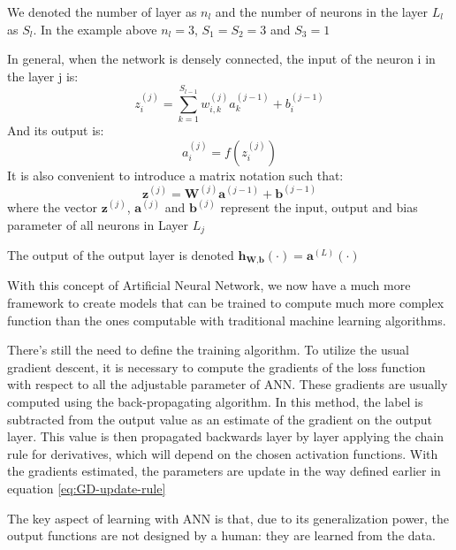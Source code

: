 \documentclass{article}
\begin{document}
We denoted the number of layer as $n_l$ and the number of neurons in the layer $L_l$ as $S_l$. In the example above $n_l=3$, $S_1 = S_2 = 3$ and $S_3 = 1$

In general, when the network is densely connected, the input of the neuron i in the layer j is:
\begin{equation}
z_i^{(j)} = \sum_{k=1}^{S_{l-1}} w_{i,k}^{(j)} a_k^{(j-1)} + b_i^{(j-1)}  
\end{equation}
And its output is:
\begin{equation}
a_i^{(j)} = f(z_i^{(j)})
\end{equation}
It is also convenient to introduce a matrix notation such that:
\begin{equation}
\textbf{z}^{(j)} = \textbf{W}^{(j)} \textbf{a}^{(j-1)} + \textbf{b}^{(j-1)}
\end{equation}
where the vector $\textbf{z}^{(j)}$, $\textbf{a}^{(j)}$ and $\textbf{b}^{(j)}$ represent the input, output and bias parameter of all neurons in Layer $L_j$

The output of the output layer is denoted $\textbf{h}_{\textbf{W},\textbf{b}}\left( \cdot \right) = \textbf{a}^{(L)}\left( \cdot \right)$



With this concept of Artificial Neural Network, we now have a much more framework to create models that can be trained to compute much more complex function than the ones computable with traditional machine learning algorithms.
 
There's still the need to define the training algorithm. To utilize the usual gradient descent, it is necessary to compute the gradients of the loss function with respect to all the adjustable parameter of ANN. These gradients are usually computed using the back-propagating algorithm. In this method, the label is subtracted from the output value as an estimate of the gradient on the output layer. This value is then propagated backwards layer by layer applying the chain rule for derivatives, which will depend on the chosen activation functions. With the gradients estimated, the parameters are update in the way defined earlier in equation \ref{eq:GD-update-rule}

The key aspect of learning with ANN is that, due to its generalization power, the output functions are not designed by a human: they are learned from the data.
\end{document}
